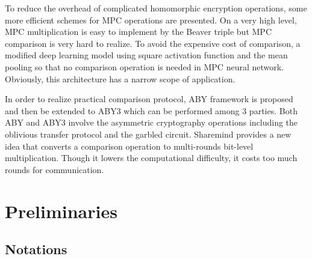 \documentclass[letterpaper]{article} %
\begin{document}
    To reduce the overhead of complicated homomorphic encryption operations,
    some more efficient schemes for MPC operations are presented.
    On a very high level, MPC multiplication is easy to implement by the Beaver triple \cite{EfficientMultipartyProtocols}
    but MPC comparison is very hard to realize.
    To avoid the expensive cost of comparison,
    a modified deep learning model \cite{CryptoNets} using square activation function and the mean pooling so that
    no comparison operation is needed in MPC neural network.
    Obviously, this architecture has a narrow scope of application.

    In order to realize practical comparison protocol, ABY framework \cite{ABY} is proposed
    and then be extended to ABY3 \cite{ABY3} which can be performed among 3 parties.
    Both ABY and ABY3 involve the asymmetric cryptography operations
    including the oblivious transfer protocol and the garbled circuit.
    Sharemind provides a new idea that converts a comparison operation to
    multi-rounds bit-level multiplication.
    Though it lowers the computational difficulty, it costs too much rounds for
    communication.



\section{Preliminaries}
    \subsection{Notations}
\end{document}
